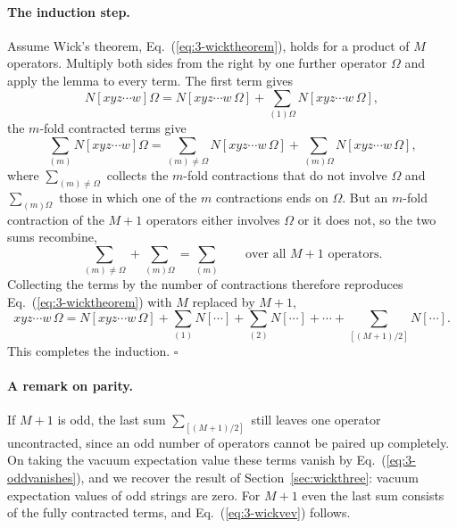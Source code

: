 \paragraph{The induction step.}
Assume Wick's theorem, Eq.~(\ref{eq:3-wicktheorem}), holds for a product of
$M$ operators.  Multiply both sides from the right by one further operator
$\Omega$ and apply the lemma to every term.  The first term gives
\begin{equation}
  N\left[xyz\cdots w\right]\Omega
   = N\left[xyz\cdots w\,\Omega\right]
   + \sum_{(1)\Omega} N\left[xyz\cdots w\,\Omega\right],
  \label{eq:3-induct1}
\end{equation}
the $m$-fold contracted terms give
\begin{equation}
  \sum_{(m)} N\left[xyz\cdots w\right]\Omega
   = \sum_{(m)\ne\Omega} N\left[xyz\cdots w\,\Omega\right]
   + \sum_{(m)\Omega} N\left[xyz\cdots w\,\Omega\right],
  \label{eq:3-induct2}
\end{equation}
where $\sum_{(m)\ne\Omega}$ collects the $m$-fold contractions that do not
involve $\Omega$ and $\sum_{(m)\Omega}$ those in which one of the $m$
contractions ends on $\Omega$.  But an $m$-fold contraction of the $M+1$
operators either involves $\Omega$ or it does not, so the two sums recombine,
\begin{equation}
  \sum_{(m)\ne\Omega} + \sum_{(m)\Omega} = \sum_{(m)}
  \qquad\text{over all } M+1 \text{ operators.}
  \label{eq:3-recombine}
\end{equation}
Collecting the terms by the number of contractions therefore reproduces
Eq.~(\ref{eq:3-wicktheorem}) with $M$ replaced by $M+1$,
\begin{equation}
  xyz\cdots w\,\Omega
   = N\left[xyz\cdots w\,\Omega\right]
   + \sum_{(1)} N\left[\cdots\right]
   + \sum_{(2)} N\left[\cdots\right]
   + \cdots
   + \sum_{[(M+1)/2]} N\left[\cdots\right] .
  \label{eq:3-wickM1}
\end{equation}
This completes the induction. \hfill$\square$

\paragraph{A remark on parity.}
If $M+1$ is odd, the last sum $\sum_{[(M+1)/2]}$ still leaves one operator
uncontracted, since an odd number of operators cannot be paired up completely.
On taking the vacuum expectation value these terms vanish by
Eq.~(\ref{eq:3-oddvanishes}), and we recover the result of
Section~\ref{sec:wickthree}: vacuum expectation values of odd strings are
zero.  For $M+1$ even the last sum consists of the fully contracted terms,
and Eq.~(\ref{eq:3-wickvev}) follows.

